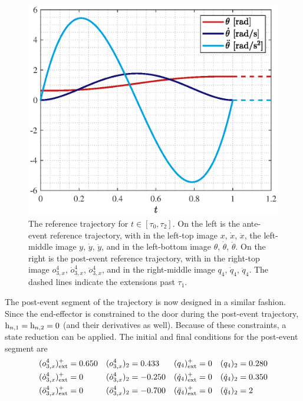 \documentclass[../DC2019003Bouma.tex]{subfiles}
\begin{document}
\begin{figure}[bt!]
\begin{minipage}[l]{.5\textwidth}
\centering
\includegraphics[width=\textwidth]{thtraj01.eps}
\end{minipage}
\caption{The reference trajectory for $t\in[\tau_0,\tau_2]$. On the left is the ante-event reference trajectory, with in the left-top image $x$, $\dot{x}$, $\ddot{x}$, the left-middle image $y$, $\dot{y}$, $\ddot{y}$, and in the left-bottom image $\theta$, $\dot{\theta}$, $\ddot{\theta}$. On the right is the post-event reference trajectory, with in the right-top image $o_{3,x}^4$, $\dot{o}_{3,x}^4$, $\ddot{o}_{3,x}^4$, and in the right-middle image $q_4$, $\dot{q}_4$, $\ddot{q}_4$. The dashed lines indicate the extensions past $\tau_1$.}
\label{fig:5traj}
\end{figure}
The post-event segment of the trajectory is now designed in a similar fashion. Since the end-effector is constrained to the door during the post-event trajectory, $\mathrm{h}_{n,1} = \mathrm{h}_{n,2} = 0$ (and their derivatives as well). Because of these constraints, a state reduction can be applied. The initial and final conditions for the post-event segment are
\begin{align}
(o_{3,x}^4)^+_{\textnormal{ext}}&= 0.650 &(o_{3,x}^4)_2&= 0.433 &(q_4)^+_{\textnormal{ext}}&= 0 &(q_4)_2&= 0.280\nonumber\\
(\dot{o}_{3,x}^4)^+_{\textnormal{ext}}&= 0 &(\dot{o}_{3,x}^4)_2&= -0.250 &(\dot{q}_4)^+_{\textnormal{ext}}&= 0 &(\dot{q}_4)_2&= 0.350 \label{eq:5traj12}\\
(\ddot{o}_{3,x}^4)^+_{\textnormal{ext}}&= 0 &(\ddot{o}_{3,x}^4)_2&= -0.700 &(\ddot{q}_4)^+_{\textnormal{ext}}&= 0 &(\ddot{q}_4)_2&= 2 \nonumber
\end{align}
\end{document}
